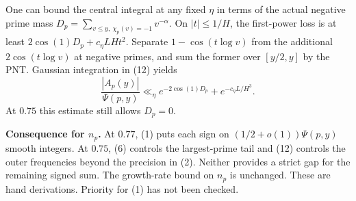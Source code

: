 \documentclass[11pt]{article}
\newcommand{\ch}{\chi_p}
\begin{document}
One can bound the central integral at any fixed \(\eta\) in terms of the
actual negative prime mass \(D_p=\sum_{v\le y,\ \ch(v)=-1}v^{-\alpha}\).
On \(|t|\le1/H\), the first-power loss is at least
\(2\cos(1)D_p+c_\eta LHt^2\). Separate \(1-\cos(t\log v)\) from the
additional \(2\cos(t\log v)\) at negative primes, and sum the former
over \([y/2,y]\) by the PNT. Gaussian integration in (12) yields
\[
 \frac{|A_p(y)|}{\Psi(p,y)}
 \ll_\eta e^{-2\cos(1)D_p}+e^{-c_\eta L/H^3}.
\]
At \(0.75\) this estimate still allows \(D_p=0\).

\textbf{Consequence for \(n_p\).} At \(0.77\), (1) puts each sign on
\((1/2+o(1))\Psi(p,y)\) smooth integers. At \(0.75\), (6) controls the
largest-prime tail and (12) controls the outer frequencies beyond the
precision in (2). Neither provides a strict gap for the remaining signed
sum. The growth-rate bound on \(n_p\) is unchanged. These are hand
derivations. Priority for (1) has not been checked.
\end{document}
